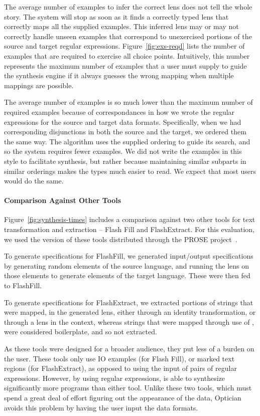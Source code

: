 \documentclass[acmsmall]{acmart}
\begin{document}
The average number of examples to
infer the correct lens does not tell the whole story.  The system will
stop as soon as it finds a correctly typed lens that correctly maps
all the supplied examples.  This inferred lens may or may not
correctly handle unseen examples that correspond to
unexercised portions of the source and target regular expressions.
Figure~\ref{fig:exs-reqd} lists
the number of examples that are required to exercise all choice
points.  Intuitively, this number represents the maximum number of
examples that a user must supply to guide the synthesis engine if it
always guesses the wrong mapping when multiple mappings are possible.

The average number of examples is so much lower than the maximum
number of required examples because of correspondances in how we wrote
the regular expressions for the source and target data formats. 
Specifically, when we had corresponding disjunctions in both the
source and the target, we ordered them the same way.  The algorithm
uses the supplied ordering to guide its search, and so the system
requires fewer examples.   We did not write the examples in this style
to facilitate synthesis, but rather because maintaining similar
subparts in similar orderings makes the types much easier to 
read. We expect that most users would do the same.

\paragraph*{Comparison Against Other Tools}
%
Figure~\ref{fig:synthesis-times} includes a comparison against two other tools
for text transformation and extraction -- Flash Fill and FlashExtract.  For this
evaluation, we used the version of these tools distributed through the
PROSE project~\cite{prose}.

To generate specifications for FlashFill, we generated input/output
specifications by generating random elements of the source language, and
running the lens on those elements to generate elements of the target language.
These were then fed to FlashFill.

To generate specifications for FlashExtract, we extracted portions of strings
that were mapped, in the generated lens, either through an identity
transformation, or through a lens in the context, whereas strings that were
mapped through use of \ConstLens{}, were considered boilerplate, and so not
extracted.

As these tools were designed for a broader audience, they put less of a burden
on the user.  These tools only use IO examples (for Flash
Fill), or marked text regions (for FlashExtract), as opposed to using the
input of pairs of regular expressions.  However, by using
regular expressions,
\Optician{} is able to synthesize significantly more programs
than either tool.  Unlike these two tools, which must spend a great deal of
effort figuring out the appearance of the data, Optician{} avoids
this problem by having the user input the data formats.
\end{document}
